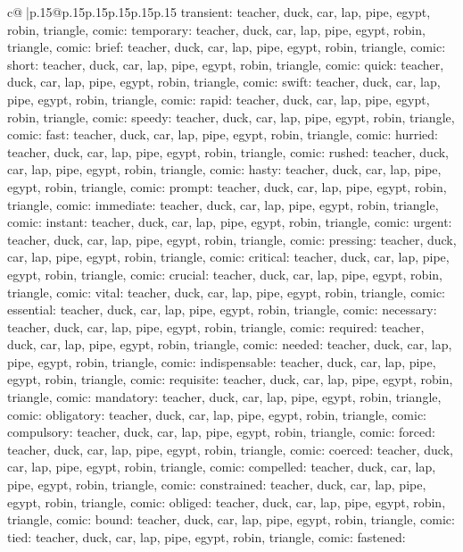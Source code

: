 \documentclass{article}
\begin{document}
{\begin{supertabular}{c@{$\;$}|p{.15\linewidth}@{}p{.15\linewidth}p{.15\linewidth}p{.15\linewidth}p{.15\linewidth}p{.15\linewidth}}
{{{transient\nTARGETS: teacher, duck, car, lap, pipe, egypt, robin, triangle, comic\n\nCLUE: temporary\nTARGETS: teacher, duck, car, lap, pipe, egypt, robin, triangle, comic\n\nCLUE: brief\nTARGETS: teacher, duck, car, lap, pipe, egypt, robin, triangle, comic\n\nCLUE: short\nTARGETS: teacher, duck, car, lap, pipe, egypt, robin, triangle, comic\n\nCLUE: quick\nTARGETS: teacher, duck, car, lap, pipe, egypt, robin, triangle, comic\n\nCLUE: swift\nTARGETS: teacher, duck, car, lap, pipe, egypt, robin, triangle, comic\n\nCLUE: rapid\nTARGETS: teacher, duck, car, lap, pipe, egypt, robin, triangle, comic\n\nCLUE: speedy\nTARGETS: teacher, duck, car, lap, pipe, egypt, robin, triangle, comic\n\nCLUE: fast\nTARGETS: teacher, duck, car, lap, pipe, egypt, robin, triangle, comic\n\nCLUE: hurried\nTARGETS: teacher, duck, car, lap, pipe, egypt, robin, triangle, comic\n\nCLUE: rushed\nTARGETS: teacher, duck, car, lap, pipe, egypt, robin, triangle, comic\n\nCLUE: hasty\nTARGETS: teacher, duck, car, lap, pipe, egypt, robin, triangle, comic\n\nCLUE: prompt\nTARGETS: teacher, duck, car, lap, pipe, egypt, robin, triangle, comic\n\nCLUE: immediate\nTARGETS: teacher, duck, car, lap, pipe, egypt, robin, triangle, comic\n\nCLUE: instant\nTARGETS: teacher, duck, car, lap, pipe, egypt, robin, triangle, comic\n\nCLUE: urgent\nTARGETS: teacher, duck, car, lap, pipe, egypt, robin, triangle, comic\n\nCLUE: pressing\nTARGETS: teacher, duck, car, lap, pipe, egypt, robin, triangle, comic\n\nCLUE: critical\nTARGETS: teacher, duck, car, lap, pipe, egypt, robin, triangle, comic\n\nCLUE: crucial\nTARGETS: teacher, duck, car, lap, pipe, egypt, robin, triangle, comic\n\nCLUE: vital\nTARGETS: teacher, duck, car, lap, pipe, egypt, robin, triangle, comic\n\nCLUE: essential\nTARGETS: teacher, duck, car, lap, pipe, egypt, robin, triangle, comic\n\nCLUE: necessary\nTARGETS: teacher, duck, car, lap, pipe, egypt, robin, triangle, comic\n\nCLUE: required\nTARGETS: teacher, duck, car, lap, pipe, egypt, robin, triangle, comic\n\nCLUE: needed\nTARGETS: teacher, duck, car, lap, pipe, egypt, robin, triangle, comic\n\nCLUE: indispensable\nTARGETS: teacher, duck, car, lap, pipe, egypt, robin, triangle, comic\n\nCLUE: requisite\nTARGETS: teacher, duck, car, lap, pipe, egypt, robin, triangle, comic\n\nCLUE: mandatory\nTARGETS: teacher, duck, car, lap, pipe, egypt, robin, triangle, comic\n\nCLUE: obligatory\nTARGETS: teacher, duck, car, lap, pipe, egypt, robin, triangle, comic\n\nCLUE: compulsory\nTARGETS: teacher, duck, car, lap, pipe, egypt, robin, triangle, comic\n\nCLUE: forced\nTARGETS: teacher, duck, car, lap, pipe, egypt, robin, triangle, comic\n\nCLUE: coerced\nTARGETS: teacher, duck, car, lap, pipe, egypt, robin, triangle, comic\n\nCLUE: compelled\nTARGETS: teacher, duck, car, lap, pipe, egypt, robin, triangle, comic\n\nCLUE: constrained\nTARGETS: teacher, duck, car, lap, pipe, egypt, robin, triangle, comic\n\nCLUE: obliged\nTARGETS: teacher, duck, car, lap, pipe, egypt, robin, triangle, comic\n\nCLUE: bound\nTARGETS: teacher, duck, car, lap, pipe, egypt, robin, triangle, comic\n\nCLUE: tied\nTARGETS: teacher, duck, car, lap, pipe, egypt, robin, triangle, comic\n\nCLUE: fastened\nTARGETS: }}}
\end{supertabular}}
\end{document}

